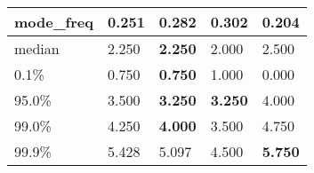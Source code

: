 \begin{table}[H]
\begin{tabular}{|l|m{10em}|m{10em}|m{10em}|m{10em}|}
\hline mode\_freq & 0.251 & \bfseries 0.282 & \cellcolor[rgb]{0.9, 0.54, 0.52} 0.302 & 0.204 \\
\hline median & 2.250 & \bfseries 2.250 & \cellcolor[rgb]{0.9, 0.54, 0.52} 2.000 & \cellcolor[rgb]{0.9, 0.54, 0.52} 2.500 \\
\hline 0.1\% & 0.750 & \bfseries 0.750 & 1.000 & \cellcolor[rgb]{0.9, 0.54, 0.52} 0.000 \\
\hline 95.0\% & 3.500 & \bfseries 3.250 & \bfseries 3.250 & \cellcolor[rgb]{0.9, 0.54, 0.52} 4.000 \\
\hline 99.0\% & 4.250 & \bfseries 4.000 & \cellcolor[rgb]{0.9, 0.54, 0.52} 3.500 & 4.750 \\
\hline 99.9\% & 5.428 & 5.097 & \cellcolor[rgb]{0.9, 0.54, 0.52} 4.500 & \bfseries 5.750 \\
\hline
\end{tabular}
\end{table}
